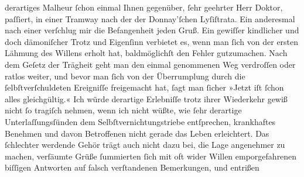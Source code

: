 \begin{ledgroupsized}[t]{13cm}
               derartiges Malheur ſchon einmal Ihnen gegenüber, ſehr geehrter \introOben{}Herr\introOben{} Doktor, paſſiert, in einer Tramway nach der \label{K_L01840-1v}\label{K_L01840-1h}
               der Donnay’ſchen {\pb}Lyſiſtrata. Ein anderesmal nach einer \label{K_L01840-2v}\label{K_L01840-2h} verſchlug mir die Befangenheit jeden
               Gruß. Ein gewiſſer kindlicher und doch dämoniſcher Trotz und Eigenſinn verbietet es,
               wenn man ſich von der ersten Lähmung des Willens erholt hat, baldmöglichſt den Fehler
               gutzumachen. Nach dem Geſetz der Trägheit geht man den einmal genommenen Weg
               verdroſſen oder ratlos weiter, und bevor man ſich von der Überrumplung durch die
               ſelbſtverſchuldeten Ereigniſſe freigemacht hat, ſagt man ſicher »Jetzt iſt ſchon
               alles gleichgültig.« Ich würde derartige Erlebniſſe trotz ihrer Wiederkehr gewiß
               nicht ſo tragiſch nehmen, wenn ich nicht wüßte, wie ſehr derartige
               Unterlaſſungsſünden dem Selbſtvernichtungstriebe entſprechen, krankhaftes Benehmen
               und davon Betroffenen nicht gerade das Leben erleichtert. Das ſchlechter werdende
               Gehör trägt auch nicht dazu bei, {\pb}die Lage
               angenehmer zu machen, verſäumte Grüße ſummierten ſich mit oft wider Willen
               emporgefahrenen biſſigen Antworten auf falsch verſtandenen Bemerkungen, und entrißen

\end{ledgroupsized}
